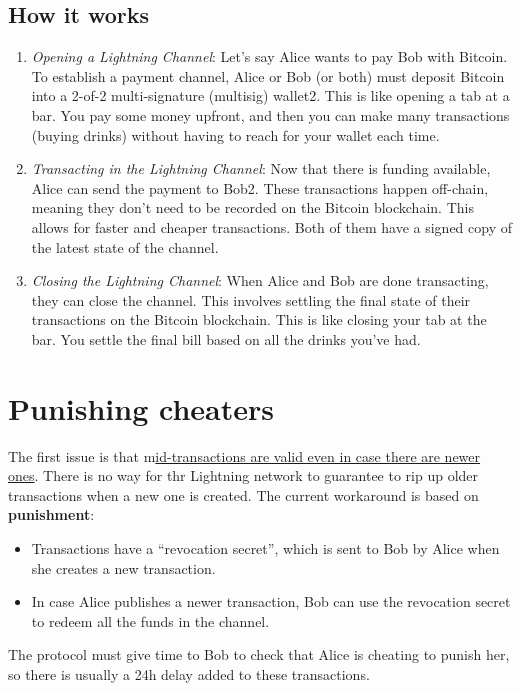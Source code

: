 \subsection{How it works}
\begin{enumerate}


   \item \textit{Opening a Lightning Channel}:
   Let’s say Alice wants to pay Bob with Bitcoin. To establish a payment channel, Alice or Bob (or both) must deposit Bitcoin into a 2-of-2 multi-signature (multisig) wallet2. This is like opening a tab at a bar. You pay some money upfront, and then you can make many transactions (buying drinks) without having to reach for your wallet each time.

   \item \textit{Transacting in the Lightning Channel}:
   Now that there is funding available, Alice can send the payment to Bob2. These transactions happen off-chain, meaning they don’t need to be recorded on the Bitcoin blockchain. This allows for faster and cheaper transactions.
   Both of them have a signed copy of the latest state of the channel.

   \item \textit{Closing the Lightning Channel}:
   When Alice and Bob are done transacting, they can close the channel. This involves settling the final state of their transactions on the Bitcoin blockchain. This is like closing your tab at the bar. You settle the final bill based on all the drinks you’ve had.

\end{enumerate}

\section{Punishing cheaters}
The first issue is that m\ul{id-transactions are valid even in case there are newer ones}.
There is no way for thr Lightning network to guarantee to rip up older transactions when a new one is created.
The current workaround is based on \textbf{punishment}:
\begin{itemize}
   \item Transactions have a ``revocation secret'', which is sent to Bob by Alice when she creates a new transaction.
   \item In case Alice publishes a newer transaction, Bob can use the revocation secret to redeem all the funds in the channel.
\end{itemize}
The protocol must give time to Bob to check that Alice is cheating to punish her, so there is usually a 24h delay added to these transactions.

